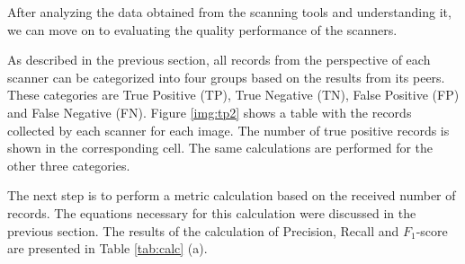 After analyzing the data obtained from the scanning tools and understanding it, we can move on to evaluating the quality performance of the scanners.

As described in the previous section, all records from the perspective of each scanner can be categorized into four groups based on the results from its peers. These categories are True Positive (TP), True Negative (TN), False Positive (FP) and False Negative (FN). Figure \ref{img:tp2} shows a table with the records collected by each scanner for each image. The number of true positive records is shown in the corresponding cell. The same calculations are performed for the other three categories.


The next step is to perform a metric calculation based on the received number of records. The equations necessary for this calculation were discussed in the previous section. The results of the calculation of Precision, Recall and $F_1$-score are presented in Table \ref{tab:calc} (a).


\begin{table}[htb]
    \centering
    {\small
    \hfill
    \caption{Quality metrics}
    \label{tab:calc}
}
\end{table}


